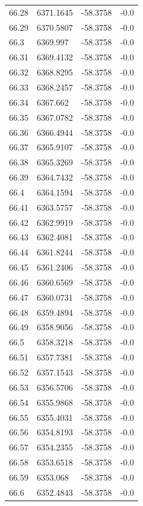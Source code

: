 \begin{table}[H]
\begin{tabular}{llll}
66.28 & 6371.1645 & -58.3758 & -0.0 \\
66.29 & 6370.5807 & -58.3758 & -0.0 \\
66.3 & 6369.997 & -58.3758 & -0.0 \\
66.31 & 6369.4132 & -58.3758 & -0.0 \\
66.32 & 6368.8295 & -58.3758 & -0.0 \\
66.33 & 6368.2457 & -58.3758 & -0.0 \\
66.34 & 6367.662 & -58.3758 & -0.0 \\
66.35 & 6367.0782 & -58.3758 & -0.0 \\
66.36 & 6366.4944 & -58.3758 & -0.0 \\
66.37 & 6365.9107 & -58.3758 & -0.0 \\
66.38 & 6365.3269 & -58.3758 & -0.0 \\
66.39 & 6364.7432 & -58.3758 & -0.0 \\
66.4 & 6364.1594 & -58.3758 & -0.0 \\
66.41 & 6363.5757 & -58.3758 & -0.0 \\
66.42 & 6362.9919 & -58.3758 & -0.0 \\
66.43 & 6362.4081 & -58.3758 & -0.0 \\
66.44 & 6361.8244 & -58.3758 & -0.0 \\
66.45 & 6361.2406 & -58.3758 & -0.0 \\
66.46 & 6360.6569 & -58.3758 & -0.0 \\
66.47 & 6360.0731 & -58.3758 & -0.0 \\
66.48 & 6359.4894 & -58.3758 & -0.0 \\
66.49 & 6358.9056 & -58.3758 & -0.0 \\
66.5 & 6358.3218 & -58.3758 & -0.0 \\
66.51 & 6357.7381 & -58.3758 & -0.0 \\
66.52 & 6357.1543 & -58.3758 & -0.0 \\
66.53 & 6356.5706 & -58.3758 & -0.0 \\
66.54 & 6355.9868 & -58.3758 & -0.0 \\
66.55 & 6355.4031 & -58.3758 & -0.0 \\
66.56 & 6354.8193 & -58.3758 & -0.0 \\
66.57 & 6354.2355 & -58.3758 & -0.0 \\
66.58 & 6353.6518 & -58.3758 & -0.0 \\
66.59 & 6353.068 & -58.3758 & -0.0 \\
66.6 & 6352.4843 & -58.3758 & -0.0 \\

\end{tabular}
\end{table}
